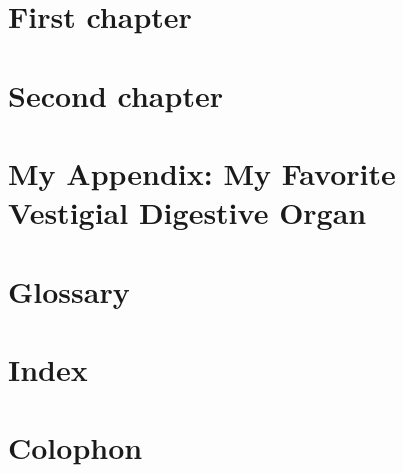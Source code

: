 \documentclass[capstoc,capschap]{rpisudiss}
\begin{document}
\frontmatter

\tableofcontents

\mainmatter %

\chapter{First chapter}
\chapter{Second chapter}

\appendix

\chapter{My Appendix: My Favorite Vestigial Digestive Organ}
\blindtext

\backmatter

\chapter{Glossary}
\chapter{Index}
\chapter{Colophon}
\end{document}
